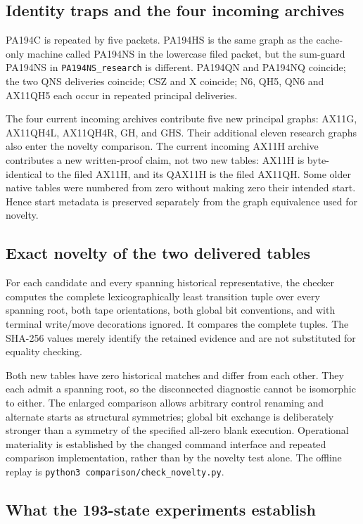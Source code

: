 \subsection{Identity traps and the four incoming archives}

PA194C is repeated by five packets. PA194HS is the same graph as the
cache-only machine called PA194NS in the lowercase filed packet, but the
sum-guard PA194NS in \texttt{PA194NS\_research} is different. PA194QN and
PA194NQ coincide; the two QNS deliveries coincide; CSZ and X coincide;
N6, QH5, QN6 and AX11QH5 each occur in repeated principal deliveries.

The four current incoming archives contribute five new principal graphs:
AX11G, AX11QH4L, AX11QH4R, GH, and GHS. Their additional eleven research
graphs also enter the novelty comparison. The current incoming AX11H
archive contributes a new written-proof claim, not two new tables:
AX11H is byte-identical to the filed AX11H, and its QAX11H is the filed
AX11QH. Some older native tables were numbered from zero without making
zero their intended start. Hence start metadata is preserved separately
from the graph equivalence used for novelty.

\subsection{Exact novelty of the two delivered tables}

For each candidate and every spanning historical representative, the
checker computes the complete lexicographically least transition tuple
over every spanning root, both tape orientations, both global bit
conventions, and with terminal write/move decorations ignored. It compares
the complete tuples. The SHA-256 values merely identify the retained
evidence and are not substituted for equality checking.

Both new tables have zero historical matches and differ from each other.
They each admit a spanning root, so the disconnected diagnostic cannot
be isomorphic to either. The enlarged comparison allows arbitrary control
renaming and alternate starts as structural symmetries; global bit exchange
is deliberately stronger than a symmetry of the specified all-zero blank
execution. Operational materiality is established by the changed command
interface and repeated comparison implementation, rather than by the
novelty test alone. The offline replay is
\texttt{python3 comparison/check\_novelty.py}.

\subsection{What the 193-state experiments establish}

